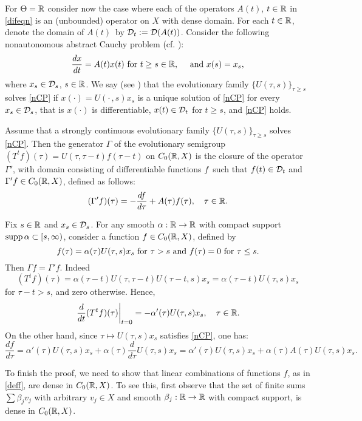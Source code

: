 \begin{exmp}
For $\Theta={\Bbb{R}}$ consider now the case where each of the operators $A(t)$,
$t\in{\Bbb{R}}$ in \eqref{difeqn} is an (unbounded) operator on
$X$ with dense domain.
For each $t\in{\Bbb{R}}$, denote
the domain of $A(t)$\ by ${\cal{D}}_t:={\cal{D}}(A(t))$.
Consider the following nonautonomous abstract Cauchy problem (cf.
\cite{Nag2}):
\begin{equation}\lb{nCP}
\dfrac{dx}{dt}=A(t)x(t) \mbox{  for  } t\ge s\in\bbR,\quad\mbox{
and  } x(s)=x_s,
\end{equation}
  where $x_s\in{\cal{D}}_s$, $s\in{\Bbb{R}}$.
We say (see \cite{Nag2}) that the evolutionary family
$\{U(\tau,s)\}_{\tau\ge
s}$ solves \eqref{nCP} if $x(\cdot)=U(\cdot\,,s)x_s$ is a unique
solution of \eqref{nCP} for every $x_s\in{\cal{D}}_s$, that is
$x(\cdot)$ is differentiable, $x(t)\in{\cal{D}}_t$ for $t\ge s$, and
\eqref{nCP} holds.
\begin{prop} Assume that a strongly continuous
evolutionary family $\{U(\tau,s)\}_{\tau\ge
s}$ solves \eqref{nCP}. Then the generator $\Gamma$ of the
evolutionary semigroup $(T^tf)(\tau)=U(\tau,\tau-t)f(\tau-t)$ on
$C_0({\Bbb{R}},X)$ is the closure of the operator $\Gamma'$,
with domain consisting of differentiable functions $f$\ such
that $f(t) \in {\cal{D}}_t$ and $\Gamma'f\in C_0({\Bbb{R}},X)$, defined
as follows:
\begin{equation}\lb{gamma'}
(\Gamma'f)(\tau)=-\dfrac{df}{d\tau}+A(\tau)f(\tau),
\quad
\tau\in\bbR.
\end{equation}
 \end{prop}
\begin{pf}
Fix $s\in{\Bbb{R}}$ and $x_s\in{\cal{D}}_s$. For any smooth
$\alpha:{\Bbb{R}}\to{\Bbb{R}}$ with compact support $\operatorname{supp}\alpha\subset
[s,\infty)$, consider a function $f\in C_0({\Bbb{R}},X)$, defined by
\begin{equation}\lb{deff}
f(\tau)=\alpha(\tau)U(\tau,s)x_s \mbox{  for  } \tau> s \mbox{  and
} f(\tau)=0 \mbox{ for } \tau\le s.
\end{equation}
Then $\Gamma f=\Gamma' f$.  Indeed
\[ (T^tf)(\tau)=\alpha(\tau-t)U(\tau,\tau-t)U(\tau-t,s)x_s=
\alpha(\tau-t)U(\tau,s)x_s
\] for
$\tau-t>s$, and zero otherwise.
Hence,
$$\left.\dfrac{d}{dt}(T^t
f)(\tau)\right|_{t=0}=-\alpha'(\tau)U(\tau,s)x_s,\quad \tau\in{\Bbb{R}}.
$$
On the other hand, since $\tau\mapsto U(\tau,s)x_s$ satisfies
\eqref{nCP}, one has:
\[\dfrac{df}{d\tau}=\alpha'(\tau)U(\tau,s)x_s+
\alpha(\tau)\dfrac{d}{d\tau}U(\tau,s)x_s=
\alpha'(\tau)U(\tau,s)x_s+\alpha(\tau)A(\tau)U(\tau,s)x_s.\]

To finish the proof, we need to show
 that  linear combinations of
functions $f$, as in \eqref{deff}, are dense in $C_0({\Bbb{R}},X)$. To see this,
first observe that the
set of finite sums $\sum\beta_jv_j$ with arbitrary $v_j\in X$ and
smooth $\beta_j:{\Bbb{R}}\to{\Bbb{R}}$ with compact support, is dense in
$C_0({\Bbb{R}},X)$.


\end{pf}
\end{exmp}
